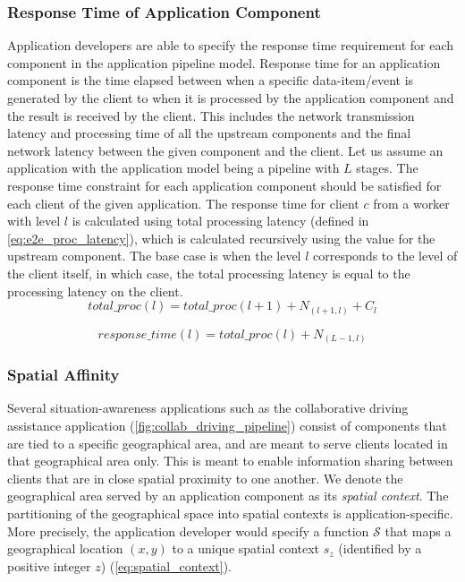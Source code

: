 \subsubsection{Response Time of Application Component}
Application developers are able to specify the response time requirement for each component in the application pipeline model. Response time for an application component is the time elapsed between when a specific data-item/event is generated by the client to when it is processed by the application component and the result is received by the client. This includes the network transmission latency and processing time of all the upstream components and the final network latency between the given component and the client. Let us assume an application with the application model being a pipeline with $L$ stages. The response time constraint for each application component should be satisfied for each client of the given application. The response time for client $c$ from a worker with level $l$ is calculated using total processing latency (defined in \cref{eq:e2e_proc_latency}), which is calculated recursively using the value for the upstream component. The base case is when the level $l$ corresponds to the level of the client itself, in which case, the total processing latency is equal to the processing latency on the client.
\begin{equation}
\label{eq:e2e_proc_latency}
total\_proc \left( l \right) = total\_proc \left(l+1 \right) + N_{\left( l+1, l\right)} + C_{l}
\end{equation}

\begin{equation}
\label{eq:response_time}
response\_time \left( l \right) = total\_proc \left(l \right) + N_{\left( L-1, l\right)} 
\end{equation}

\subsubsection{Spatial Affinity}
Several situation-awareness applications such as the collaborative driving assistance application (\cref{fig:collab_driving_pipeline}) consist of components that are tied to a specific geographical area, and are meant to serve clients located in that geographical area only. This is meant to enable information sharing between clients that are in close spatial proximity to one another. We denote the geographical area served by an application component as its \textit{spatial context}. The partitioning of the geographical space into spatial contexts is application-specific. More precisely, the application developer would specify a function $\mathcal{S}$ that maps a geographical location $\left( x , y \right)$ to a unique spatial context $s_z$ (identified by a positive integer $z$) (\cref{eq:spatial_context}).

